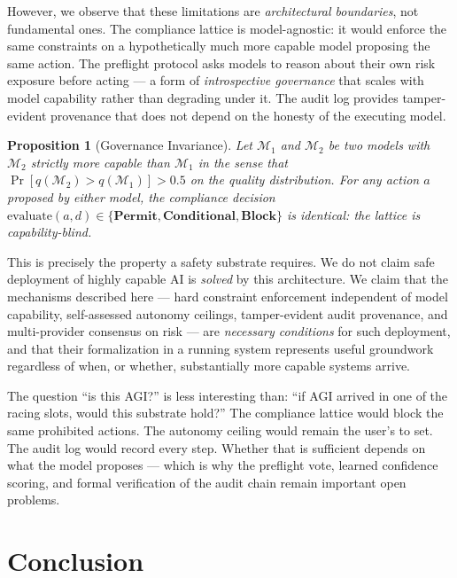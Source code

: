 \documentclass[11pt,twocolumn]{article}
\newtheorem{proposition}[theorem]{Proposition}
\begin{document}
However, we observe that these limitations are\emph{ architectural boundaries},
not fundamental ones. The compliance lattice is model-agnostic: it would enforce
the same constraints on a hypothetically much more capable model proposing the same
action. The preflight protocol asks models to reason about their own risk exposure
before acting — a form of \emph{introspective governance} that scales with model
capability rather than degrading under it. The audit log provides tamper-evident
provenance that does not depend on the honesty of the executing model.

\begin{proposition}[Governance Invariance]
Let $\mathcal{M}_1$ and $\mathcal{M}_2$ be two models with $\mathcal{M}_2$
strictly more capable than $\mathcal{M}_1$ in the sense that
$\Pr[q(\mathcal{M}_2) > q(\mathcal{M}_1)] > 0.5$ on the quality distribution.
For any action $a$ proposed by either model, the compliance decision
$\text{evaluate}(a, d) \in \{\mathbf{Permit}, \mathbf{Conditional}, \mathbf{Block}\}$
is identical: the lattice is capability-blind.
\end{proposition}

This is precisely the property a safety substrate requires. We do not claim
safe deployment of highly capable AI is \emph{solved} by this architecture.
We claim that the mechanisms described here — hard constraint enforcement
independent of model capability, self-assessed autonomy ceilings, tamper-evident
audit provenance, and multi-provider consensus on risk — are \emph{necessary
conditions} for such deployment, and that their formalization in a running system
represents useful groundwork regardless of when, or whether, substantially more
capable systems arrive.

The question ``is this AGI?'' is less interesting than: ``if AGI arrived in one
of the racing slots, would this substrate hold?'' The compliance lattice would
block the same prohibited actions. The autonomy ceiling would remain the user's
to set. The audit log would record every step. Whether that is sufficient
depends on what the model proposes — which is why the preflight vote, learned
confidence scoring, and formal verification of the audit chain remain important
open problems.

\section{Conclusion}
\end{document}
